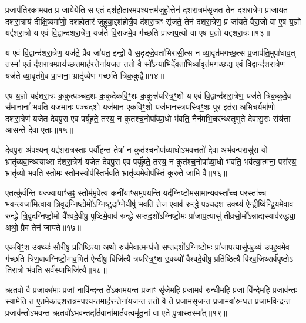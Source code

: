 प्र॒जाप॑तिरकामयत॒ प्र जा॑ये॒येति॒ स ए॒तं दश॑होतारमपश्य॒त्तम॑जुहो॒त्तेन॑ दशरा॒त्रम॑सृजत॒ तेन॑ दशरा॒त्रेण॒ प्राजा॑यत दशरा॒त्राय॑ दीक्षि॒ष्यमा॑णो॒ दश॑होतारं जुहुया॒द्दश॑होत्रै॒व द॑शरा॒त्रꣳ सृ॑जते॒ तेन॑ दशरा॒त्रेण॒ प्र जा॑यते वैरा॒जो वा ए॒ष य॒ज्ञो यद्द॑शरा॒त्रो य ए॒वं वि॒द्वान्द॑शरा॒त्रेण॒ यज॑ते वि॒राज॑मे॒व ग॑च्छति प्राजाप॒त्यो वा ए॒ष य॒ज्ञो यद्द॑शरा॒त्रः॥१३॥

य ए॒वं वि॒द्वान्द॑शरा॒त्रेण॒ यज॑ते॒ प्रैव जा॑यत॒ इन्द्रो॒ वै स॒दृङ्दे॒वता॑भिरासी॒त्स न व्या॒वृत॑मगच्छ॒त्स प्र॒जाप॑ति॒मुपा॑धाव॒त् तस्मा॑ ए॒तं द॑शरा॒त्रम्प्राय॑च्छ॒त्तमाह॑र॒त्तेना॑यजत॒ ततो॒ वै सो᳚\-ऽन्याभि॑र्दे॒वता॑भिर्व्या॒वृत॑मगच्छ॒द्य ए॒वं वि॒द्वान्द॑शरा॒त्रेण॒ यज॑ते व्या॒वृत॑मे॒व पा॒प्मना॒ भ्रातृ॑व्येण गच्छति त्रिक॒कुद्वै॥१४॥

ए॒ष य॒ज्ञो यद्द॑शरा॒त्रः क॒कुत्प॑ञ्चद॒शः क॒कुदे॑कवि॒ꣳ॒शः क॒कुत्त्र॑यस्त्रि॒ꣳ॒शो य ए॒वं वि॒द्वान्द॑शरा॒त्रेण॒ यज॑ते त्रिक॒कुदे॒व स॑मा॒नानां᳚ भवति॒ यज॑मानः पञ्चद॒शो यज॑मान एकवि॒ꣳ॒शो यज॑मानस्त्रयस्त्रि॒ꣳ॒शः पुर॒ इत॑रा अभिच॒र्यमा॑णो दशरा॒त्रेण॑ यजेत देवपु॒रा ए॒व पर्यू॑हते॒ तस्य॒ न कुत॑श्च॒नोपा᳚व्या॒धो भ॑वति॒ नैन॑मभि॒चर᳚न्थ्स्तृणुते देवासु॒राः संय॑त्ता आस॒न्ते दे॒वा ए॒ताः॥१५॥

दे॒व॒पु॒रा अ॑पश्य॒न् यद्द॑शरा॒त्रस्ताः पर्यौ॑हन्त॒ तेषां॒ न कुत॑श्च॒नोपा᳚व्या॒धो॑\-ऽभव॒त्ततो॑ दे॒वा अभ॑व॒न्परासु॑रा॒ यो भ्रातृ॑व्यवा॒न्थ्स्याथ्स द॑शरा॒त्रेण॑ यजेत देवपु॒रा ए॒व पर्यू॑हते॒ तस्य॒ न कुत॑श्च॒नोपा᳚व्या॒धो भ॑वति॒ भव॑त्या॒त्मना॒ परा᳚स्य॒ भ्रातृ॑व्यो भवति॒ स्तोमः॒ स्तोम॒स्योप॑स्तिर्भवति॒ भ्रातृ॑व्यमे॒वोप॑स्तिं कुरुते जा॒मि वै॥१६॥

ए॒तत्कु॑र्वन्ति॒ यज्ज्यायाꣳ॑स॒ꣴ॒ स्तोम॑मु॒पेत्य॒ कनी॑याꣳसमुप॒यन्ति॒ यद॑ग्निष्टोमसा॒मान्य॒वस्ता᳚च्च प॒रस्ता᳚च्च॒ भव॒न्त्यजा॑मित्वाय त्रि॒वृद॑ग्निष्टो॒मो᳚\-ऽग्नि॒ष्टुदा᳚ग्ने॒यीषु॑ भवति॒ तेज॑ ए॒वाव॑ रुन्द्धे पञ्चद॒श उ॒क्थ्य॑ ऐ॒न्द्रीष्वि॑न्द्रि॒यमे॒वाव॑ रुन्द्धे त्रि॒वृद॑ग्निष्टो॒मो वै᳚श्वदे॒वीषु॒ पुष्टि॑मे॒वाव॑ रुन्द्धे सप्तद॒शो᳚\-ऽग्निष्टो॒मः प्रा॑जाप॒त्यासु॑ तीव्रसो॒मो᳚\-ऽन्नाद्य॒स्याव॑रुद्ध्या॒ अथो॒ प्रैव तेन॑ जायते॥१७॥

ए॒क॒वि॒ꣳ॒श उ॒क्थ्यः॑ सौ॒रीषु॒ प्रति॑ष्ठित्या॒ अथो॒ रुच॑मे॒वात्मन्ध॑त्ते सप्तद॒शो᳚\-ऽग्निष्टो॒मः प्रा॑जाप॒त्यासू॑पह॒व्य॑ उपह॒वमे॒व ग॑च्छति त्रिण॒वाव॑ग्निष्टो॒माव॒भित॑ ऐ॒न्द्रीषु॒ विजि॑त्यै त्रयस्त्रि॒ꣳ॒श उ॒क्थ्यो॑ वैश्वदे॒वीषु॒ प्रति॑ष्ठित्यै विश्व॒जिथ्सर्व॑पृष्ठो\-ऽ तिरा॒त्रो भ॑वति॒ सर्व॑स्या॒भिजि॑त्यै॥१८॥

{\anuvakamend[{प्रा॒जा॒प॒त्यो वा ए॒ष य॒ज्ञो यद्द॑शरा॒त्रस्त्रि॑क॒कुद्वा ए॒ता वै जा॑यत॒ एक॑त्रिꣳशच्च॥५॥}]}

ऋ॒तवो॒ वै प्र॒जाका॑माः प्र॒जां नावि॑न्दन्त॒ ते॑\-ऽकामयन्त प्र॒जाꣳ सृ॑जेमहि प्र॒जामव॑ रुन्धीमहि प्र॒जां वि॑न्देमहि प्र॒जाव॑न्तः स्या॒मेति॒ त ए॒तमे॑कादशरा॒त्रम॑पश्य॒न्तमाह॑र॒न्तेना॑यजन्त॒ ततो॒ वै ते प्र॒जाम॑सृजन्त प्र॒जामवा॑रुन्धत प्र॒जाम॑विन्दन्त प्र॒जाव॑न्तो\-ऽभव॒न्त ऋ॒तवो॑\-ऽभव॒न्तदा᳚र्त॒वाना॑मार्तव॒त्वमृ॑तू॒नां वा ए॒ते पु॒त्रास्तस्मा᳚त्॥१९॥

